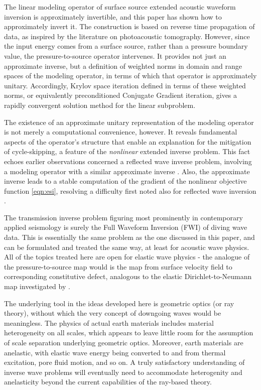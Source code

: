 \documentclass[georeport,12pt]{geophysics}
\begin{document}
The linear modeling operator of surface source extended acoustic
waveform inversion is approximately invertible, and this paper has
shown how to approximately invert it. The construction is based on
reverse time propagation of data, as inspired by the literature on
photoacoustic tomography. However, since the input energy comes from a
surface source, rather than a pressure boundary value, the
pressure-to-source operator intervenes. It provides not just an
approximate inverse, but a definition of weighted norms in domain and
range spaces of the modeling operator, in terms of which that operator
is approximately unitary. Accordingly, Krylov space iteration defined
in terms of these weighted norms, or equivalently preconditioned
Conjugate Gradient iteration, gives a rapidly convergent solution
method for the linear subproblem.

The existence of an approximate unitary representation of the modeling
operator is not merely a computational convenience, however. It
reveals fundamental aspects of the operator's structure that enable
an explanation for the mitigation of cycle-skipping, a feature of the
{\em nonlinear} extended inverse problem. This fact echoes earlier observations
concerned a reflected wave inverse problem, involving a modeling
operator with a similar approximate inverse
\cite[]{tenKroode:IPTA14,Symes:IPTA14}. Also, the approximate inverse
leads to a stable computation of the gradient of the nonlinear
objective function \ref{eqn:esi}, resolving a difficulty first noted
also for reflected wave inversion \cite[]{KerSy:94}.

The transmission inverse problem figuring most prominently in
contemporary applied seismology is surely the Full Waveform Inversion
(FWI) of diving wave data. This is essentially the same problem as the
one discussed in this paper, and can be formulated and treated the
same way, at least for acoustic wave physics. All of the topics
treated here are open for elastic wave physics - the analogue of the
pressure-to-source map would is the map from surface velocity field to
corresponding constitutive defect, analogous to the elastic
Dirichlet-to-Neumann map investigated by \cite{Rachele:00}.

The underlying tool in the ideas developed here is geometric optics
(or ray theory), without which the very concept of downgoing waves
would be meaningless. The physics of actual earth materials includes
material heterogeneity on all scales, which appears to leave little
room for the assumption of scale separation underlying geometric
optics. Moreover, earth materials are anelastic, with elastic wave
energy being converted to and from thermal excitation, pore fluid
motion, and so on. A truly satisfactory understanding of inverse wave
problems will eventually need to accommodate heterogenity and
anelasticity beyond the current capabilities of the ray-based theory.
\end{document}
